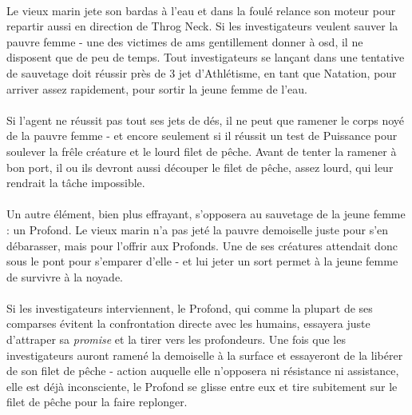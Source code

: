 \paragraph{} Le vieux marin jete son bardas à l'eau et dans la foulé relance son moteur pour repartir aussi en direction de Throg Neck. Si les 
investigateurs veulent sauver la pauvre femme - une des victimes de \gls{ams} gentillement donner à \gls{osd}, il ne disposent que de peu de temps. Tout investigateurs 
se lançant dans une tentative de sauvetage doit réussir près de 3 jet d'Athlétisme, en tant que Natation, pour arriver assez rapidement, pour sortir
la jeune femme de l'eau.

\paragraph{} Si l'agent ne réussit pas tout ses jets de dés, il ne peut que ramener le corps noyé de la pauvre femme - et encore seulement si il réussit
un test de Puissance pour soulever la frêle créature et le lourd filet de pêche. Avant de tenter la ramener à bon port, il ou ils devront aussi
découper le filet de pêche, assez lourd, qui leur rendrait la tâche impossible. 

\paragraph{} Un autre élément, bien plus effrayant, s'opposera au sauvetage de la jeune femme : un Profond. Le vieux marin n'a pas jeté la pauvre
demoiselle juste pour s'en débarasser, mais pour l'offrir aux Profonds. Une de ses créatures attendait donc sous le pont pour s'emparer d'elle - et
lui jeter un sort permet à la jeune femme de survivre à la noyade. 

\paragraph{} Si les investigateurs interviennent, le Profond, qui comme la plupart de ses comparses évitent la confrontation directe avec les humains,
essayera juste d'attraper sa \emph{promise} et la tirer vers les profondeurs. Une fois que les investigateurs auront ramené la demoiselle à la surface
et essayeront de la libérer de son filet de pêche - action auquelle elle n'opposera ni résistance ni assistance, elle est déjà inconsciente, le Profond
se glisse entre eux et tire subitement sur le filet de pêche pour la faire replonger.


